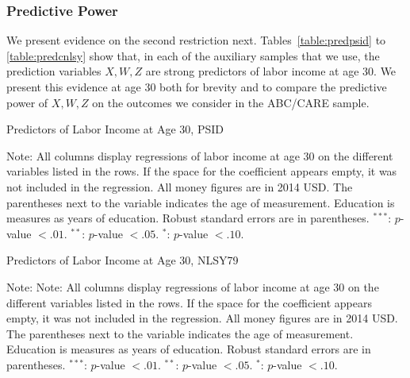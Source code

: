 \subsubsection{Predictive Power}

\noindent We present evidence on the second restriction next. Tables~\ref{table:predpsid} to \ref{table:predcnlsy} show that, in each of the auxiliary samples that we use, the prediction variables $X,W,Z$ are strong predictors of labor income at age 30. We present this evidence at age 30 both for brevity and to compare the predictive power of $X,W,Z$ on the outcomes we consider in the ABC/CARE sample.

\begin{table}[H] 
\begin{threeparttable}
\caption{Predictors of Labor Income at Age 30, PSID}
\label{table:predpsid}
\centering 

\begin{tablenotes}
\footnotesize
\item Note: All columns display regressions of labor income at age 30 on the different variables listed in the rows. If the space for the coefficient appears empty, it was not included in the regression. All money figures are in 2014 USD. The parentheses next to the variable indicates the age of measurement. Education is measures as years of education. Robust standard errors are in parentheses. $^{***}$: $p$-value $< .01$. $^{**}$: $p$-value $< .05$. $^{*}$: $p$-value $< .10$.
\end{tablenotes}
\end{threeparttable}
\end{table}

\begin{table}[H] 
\begin{threeparttable}
\caption{Predictors of Labor Income at Age 30, NLSY79}
\label{table:prednlsy}
\centering 

\begin{tablenotes}
\footnotesize
\item Note: Note: All columns display regressions of labor income at age 30 on the different variables listed in the rows. If the space for the coefficient appears empty, it was not included in the regression. All money figures are in 2014 USD. The parentheses next to the variable indicates the age of measurement. Education is measures as years of education. Robust standard errors are in parentheses. $^{***}$: $p$-value $< .01$. $^{**}$: $p$-value $< .05$. $^{*}$: $p$-value $< .10$.
\end{tablenotes}
\end{threeparttable}
\end{table}

